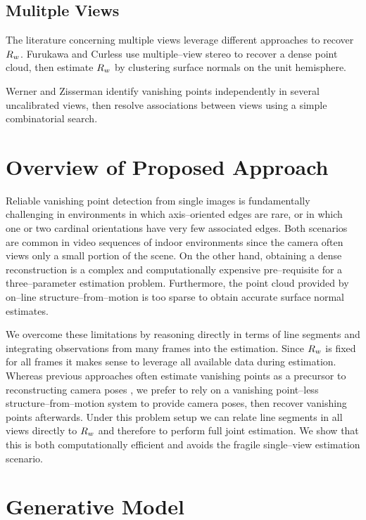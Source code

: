 \subsection{Mulitple Views}

The literature concerning multiple views leverage different approaches
to recover $\SceneR$. Furukawa and Curless \cite{Furukawa09} use
multiple--view stereo to recover a dense point cloud, then estimate
$\SceneR$ by clustering surface normals on the unit hemisphere.

Werner and Zisserman \cite{Werner02} identify vanishing points
independently in several uncalibrated views, then resolve associations
between views using a simple combinatorial search.

\section{Overview of Proposed Approach}

Reliable vanishing point detection from single images is fundamentally
challenging in environments in which axis--oriented edges are rare, or
in which one or two cardinal orientations have very few associated
edges. Both scenarios are common in video sequences of indoor
environments since the camera often views only a small portion of the
scene. On the other hand, obtaining a dense reconstruction is a
complex and computationally expensive pre--requisite for a
three--parameter estimation problem. Furthermore, the point cloud
provided by on--line structure--from--motion is too sparse to obtain
accurate surface normal estimates.

We overcome these limitations by reasoning directly in terms of line
segments and integrating observations from many frames into the
estimation. Since $\SceneR$ is fixed for all frames it makes sense to
leverage all available data during estimation. Whereas previous
approaches often estimate vanishing points as a precursor to
reconstructing camera poses \cite{Zhang02,Werner02}, we prefer to rely
on a vanishing point--less structure--from--motion system to provide
camera poses, then recover vanishing points afterwards. Under this
problem setup we can relate line segments in all views directly to
$\SceneR$ and therefore to perform full joint estimation. We show that
this is both computationally efficient and avoids the fragile
single--view estimation scenario.

\section{Generative Model}

